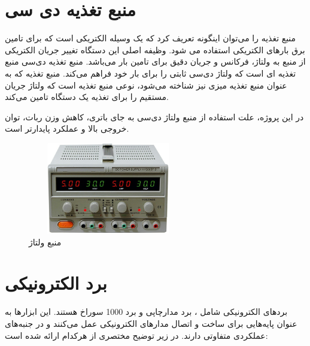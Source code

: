 \section{منبع تغذیه دی سی}

منبع تغذیه را می‌توان اینگونه تعریف کرد که یک وسیله الکتریکی است که برای تامین برق بارهای الکتریکی استفاده می شود. وظیفه اصلی این دستگاه تغییر جریان الکتریکی از منبع به ولتاژ، فرکانس و جریان دقیق برای تامین بار می‌باشد. منبع تغذیه دی‌سی
\unskip{}
 منبع تغذیه ای است که ولتاژ دی‌سی ثابتی را برای بار خود فراهم می‌کند. منبع تغذیه  که به عنوان منبع تغذیه میزی نیز شناخته می‌شود، نوعی منبع تغذیه است که ولتاژ جریان مستقیم  را برای تغذیه یک دستگاه تامین می‌کند.
 
 در این پروژه، علت استفاده از منبع ولتاژ دی‌سی به جای باتری، کاهش وزن ربات، توان خروجی بالا و عملکرد پایدارتر است. 
 
    \begin{figure}[!h]
	\centering
	\includegraphics[height=4cm,width=7cm]{./Images/CH3/DC_supply.png}
	\caption{منبع ولتاژ }
	\label{منبع ولتاژ}
	\end{figure} 

\section{برد الکترونیکی}

بردهای الکترونیکی شامل ، برد مدارچاپی 
\unskip{}
و برد‌ 1000 سوراخ
\unskip{}
هستند. این ابزارها به عنوان پایه‌هایی برای ساخت و اتصال مدارهای الکترونیکی عمل می‌کنند و در جنبه‌های عملکردی متفاوتی دارند. در زیر توضیح مختصری از هرکدام ارائه شده است:

